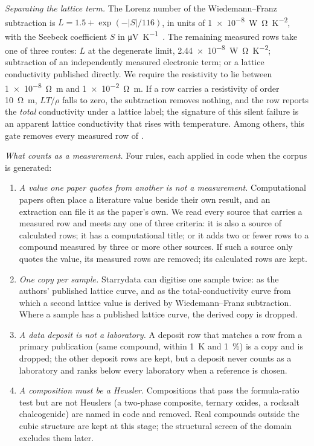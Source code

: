 \documentclass[preprint, 12pt]{elsarticle}
\begin{document}
\emph{Separating the lattice term.} The Lorenz number of the Wiedemann--Franz subtraction is
$L = 1.5 + \exp(-|S|/116)$, in units of \SI{1e-8}{\watt\ohm\per\kelvin\squared}, with the Seebeck
coefficient $S$ in \si{\micro\volt\per\kelvin}~\cite{kim2015characteri}. The remaining measured rows
take one of three routes: $L$ at the degenerate limit, \SI{2.44e-8}{\watt\ohm\per\kelvin\squared};
subtraction of an independently measured electronic term; or a lattice conductivity published
directly. We require the resistivity to lie between \SI{1e-8}{\ohm\meter} and \SI{1e-2}{\ohm\meter}.
If a row carries a resistivity of order \SI{10}{\ohm\meter}, $LT/\rho$ falls to zero, the
subtraction removes nothing, and the row reports the \emph{total} conductivity under a lattice
label; the signature of this silent failure is an apparent lattice conductivity that rises with
temperature. Among others, this gate removes every measured row of .

\emph{What counts as a measurement.} Four rules, each applied in code when the corpus is generated:
\begin{enumerate}
  \item \emph{A value one paper quotes from another is not a measurement.} Computational papers often
        place a literature value beside their own result, and an extraction can file it as the
        paper's own. We read every source that carries a measured row and meets any one of three
        criteria: it is also a source of calculated rows; it has a computational title; or it adds two
        or fewer rows to a compound measured by three or more other sources. If such a source only
        quotes the value, its measured rows are removed; its calculated rows are kept.
  \item \emph{One copy per sample.} Starrydata can digitise one sample twice: as the authors'
        published lattice curve, and as the total-conductivity curve from which a second lattice
        value is derived by Wiedemann--Franz subtraction. Where a sample has a published lattice
        curve, the derived copy is dropped.
  \item \emph{A data deposit is not a laboratory.} A deposit row that matches a row from a primary
        publication (same compound, within \SI{1}{\kelvin} and \SI{1}{\percent}) is a copy and is
        dropped; the other deposit rows are kept, but a deposit never counts as a laboratory and
        ranks below every laboratory when a reference is chosen.
  \item \emph{A composition must be a Heusler.} Compositions that pass the formula-ratio test but are
        not Heuslers (a two-phase composite, ternary oxides, a rocksalt chalcogenide) are named in
        code and removed. Real compounds outside the cubic structure are kept at this stage; the
        structural screen of the domain excludes them later.
\end{enumerate}
\end{document}
